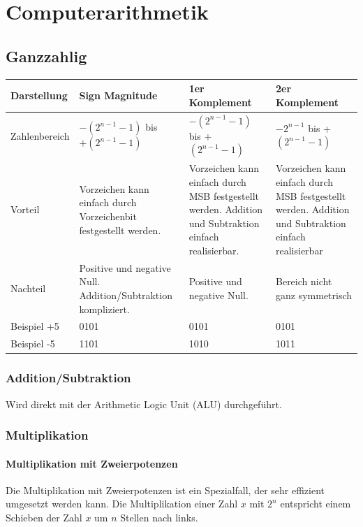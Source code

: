 \section{Computerarithmetik}

\subsection{Ganzzahlig}
\begin{tabular}{|p{3cm}|p{4.5cm}|p{4.5cm}|p{4.5cm}|}
	\hline
	Darstellung & Sign Magnitude & 1er Komplement & 2er Komplement\\
	\hline
	Zahlenbereich & $-(2^{n-1}-1)$ bis $+(2^{n-1}-1)$ & $-(2^{n-1}-1)$ bis +$(2^{n-1}-1)$ & $-2^{n-1}$ bis +$(2^{n-1}-1)$\\
	\hline
	Vorteil & Vorzeichen kann einfach durch Vorzeichenbit festgestellt werden. & Vorzeichen kann einfach durch MSB festgestellt werden. Addition und Subtraktion einfach realisierbar. & Vorzeichen kann einfach durch MSB festgestellt werden. Addition und Subtraktion einfach realisierbar \\
	\hline
	Nachteil & Positive und negative Null. Addition/Subtraktion kompliziert. & Positive und negative Null. & Bereich nicht ganz symmetrisch\\
	\hline
	Beispiel +5 & 0101 & 0101 & 0101 \\
	Beispiel -5 & 1101 & 1010 & 1011 \\
	\hline
\end{tabular}

\subsubsection{Addition/Subtraktion}
Wird direkt mit der Arithmetic Logic Unit (ALU) durchgeführt.

\subsubsection{Multiplikation}
\paragraph {Multiplikation mit Zweierpotenzen}
Die Multiplikation mit Zweierpotenzen ist ein Spezialfall, der sehr effizient umgesetzt werden kann. Die Multiplikation einer Zahl $x$ mit $2^n$ entspricht einem Schieben der Zahl $x$ um $n$ Stellen nach links.

